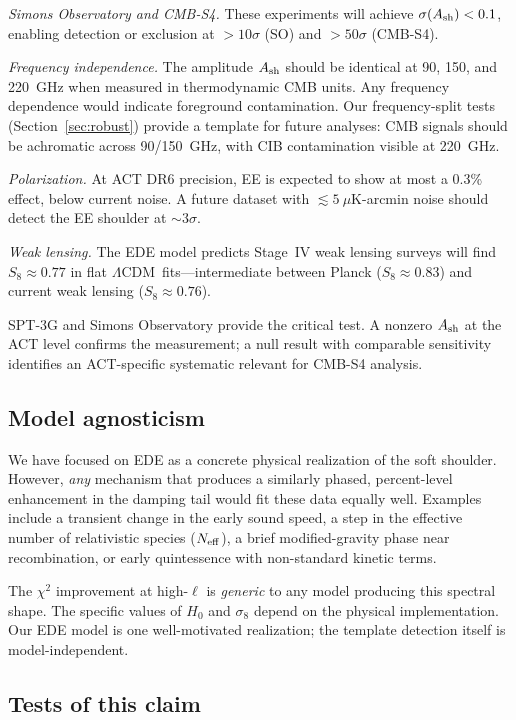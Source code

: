 \documentclass[onecolumn,showpacs,preprintnumbers,amsmath,amssymb,prd]{revtex4-2}
\newcommand{\lcdm}{$\Lambda$CDM}
\begin{document}
\emph{Simons Observatory and CMB-S4.} These experiments will achieve 
$\sigma(A_{\rm sh}) < 0.1$, enabling detection or exclusion at $>10\sigma$ 
(SO) and $>50\sigma$ (CMB-S4).

\emph{Frequency independence.} The amplitude $A_{\rm sh}$ should be 
identical at 90, 150, and 220~GHz when measured in thermodynamic CMB units. 
Any frequency dependence would indicate foreground contamination. Our 
frequency-split tests (Section~\ref{sec:robust}) provide a template for 
future analyses: CMB signals should be achromatic across 90/150~GHz, 
with CIB contamination visible at 220~GHz.

\emph{Polarization.} At ACT DR6 precision, EE is expected to show at most 
a 0.3\% effect, below current noise. A future dataset with 
$\lesssim 5~\mu$K-arcmin noise should detect the EE shoulder at $\sim 3\sigma$.

\emph{Weak lensing.} The EDE model predicts Stage~IV weak lensing surveys 
will find $S_8 \approx 0.77$ in flat \lcdm\ fits---intermediate between 
Planck ($S_8 \approx 0.83$) and current weak lensing ($S_8 \approx 0.76$).

SPT-3G and Simons Observatory provide the critical test. A nonzero $A_{\rm sh}$ 
at the ACT level confirms the measurement; a null result with comparable 
sensitivity identifies an ACT-specific systematic relevant for CMB-S4 analysis.

\subsection{Model agnosticism}
\label{sec:agnostic}

We have focused on EDE as a concrete physical realization of the soft 
shoulder. However, \emph{any} mechanism that produces a similarly phased, 
percent-level enhancement in the damping tail would fit these data 
equally well. Examples include a transient change in the early sound speed, a step in the effective number of relativistic species ($N_{\rm eff}$), a brief modified-gravity phase near recombination, or early quintessence with non-standard kinetic terms.

The $\chi^2$ improvement at high-$\ell$ is \emph{generic} to any model 
producing this spectral shape. The specific values of $H_0$ and $\sigma_8$ 
depend on the physical implementation. Our EDE model is one well-motivated 
realization; the template detection itself is model-independent.

\subsection{Tests of this claim}
\label{sec:tests}
\end{document}
